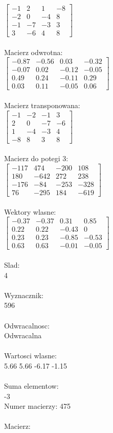 \documentclass[a4paper,12pt]{article}
\begin{document}
$\begin{bmatrix} -1&2&1&-8\\-2&0&-4&8\\-1&-7&-3&3\\3&-6&4&8 \end{bmatrix}$
\\
\\
Macierz odwrotna:\\

$\begin{bmatrix} -0.87&-0.56&0.03&-0.32\\-0.07&0.02&-0.12&-0.05\\0.49&0.24&-0.11&0.29\\0.03&0.11&-0.05&0.06 \end{bmatrix}$
\\
\\
Macierz transponowana:\\

$\begin{bmatrix} -1&-2&-1&3\\2&0&-7&-6\\1&-4&-3&4\\-8&8&3&8 \end{bmatrix}$
\\
\\
Macierz do potegi 3:\\

$\begin{bmatrix} -117&474&-200&108\\180&-642&272&238\\-176&-84&-253&-328\\76&-295&184&-619 \end{bmatrix}$
\\
\\
Wektory wlasne:\\

$\begin{bmatrix} -0.37&-0.37&0.31&0.85\\0.22&0.22&-0.43&0\\0.23&0.23&-0.85&-0.53\\0.63&0.63&-0.01&-0.05 \end{bmatrix}$
\\
\\
Slad:\\
4
\\
\\
Wyznacznik:\\
596
\\
\\
Odwracalnosc:\\
Odwracalna
\\
\\
Wartosci wlasne:\\
5.66 5.66 -6.17 -1.15
\\
\\
Suma elementow:\\
-3
\\
\newpage
Numer macierzy:
475
\\
\\
Macierz:\\
\end{document}
